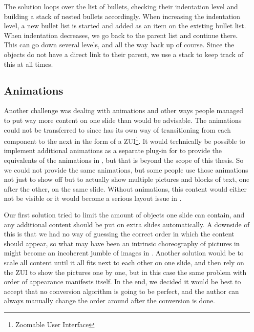     The solution loops over the list of bullets, checking their indentation
    level and building a stack of nested bullets accordingly. When increasing
    the indentation level, a new bullet list is started and added as an item on
    the existing bullet list. When indentation decreases, we go back to the
    parent list and continue there. This can go down several levels, and all
    the way back up of course. Since the objects do not have a direct link to
    their parent, we use a stack to keep track of this at all times.

   \subsection{Animations}

    Another challenge was dealing with animations and other ways people managed
    to put way more content on one slide than would be advisable. The
    animations could not be transferred to \mxp since \mxp has its own way of
    transitioning from each component to the next in the form of a
    ZUI\footnote{Zoomable User Interface}. It would technically be possible to
    implement additional animations as a separate plug-in for \mxp to provide
    the equivalents of the animations in \ppt*, but that is beyond the scope of
    this thesis. So we could not provide the same animations, but some people
    use those animations not just to show off but to actually show multiple
    pictures and blocks of text, one after the other, on the same slide.
    Without animations, this content would either not be visible or it would
    become a serious layout issue in \mxp.
   
    Our first solution tried to limit the amount of objects one slide can
    contain, and any additional content should be put on extra slides
    automatically. A downside of this is that we had no way of guessing the
    correct order in which the content should appear, so what may have been an
    intrinsic choreography of pictures in \ppt might become an incoherent
    jumble of images in \mxp. Another solution would be to scale all content
    until it all fits next to each other on one slide, and then rely on the ZUI
    to show the pictures one by one, but in this case the same problem with
    order of appearance manifests itself. In the end, we decided it would be
    best to accept that no conversion algorithm is going to be perfect, and the
    author can always manually change the order around after the conversion is
    done.

